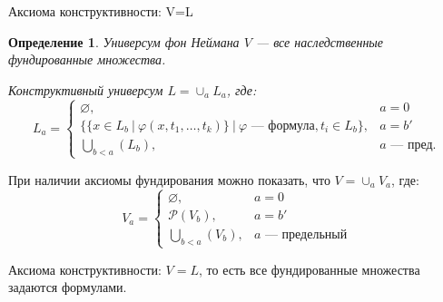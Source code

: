 \documentclass[aspectratio=169]{beamer}
\newtheorem{dfn}{Определение}[section]
\begin{document}
\begin{frame}{Аксиома конструктивности: V=L}

\begin{dfn}
\emph{Универсум фон Неймана} $V$ --- все наследственные фундированные множества.

Конструктивный универсум $L = \cup_a L_a$, где:
$$L_a = \left\{\begin{array}{ll}
    \varnothing, & a=0\\
    \{ \{ x\in L_b\ |\ \varphi(x,t_1,\dots,t_k) \}\ |\ \varphi\text{ --- формула}, t_i \in L_b\}, & a = b'\\
    \bigcup_{b < a}(L_b), & a \text{ --- пред.}
\end{array}\right.$$
\end{dfn}


\vspace{-0.3cm}При наличии аксиомы фундирования можно показать, что $V = \cup_a V_a$, где:
$$V_a = \left\{\begin{array}{ll}
    \varnothing, & a=0\\
    \mathcal{P}(V_b), & a = b'\\
    \bigcup_{b < a}(V_b), & a \text{ --- предельный}
\end{array}\right.$$

Аксиома конструктивности: $V=L$, то есть все фундированные множества задаются формулами.


\end{frame}
\end{document}
